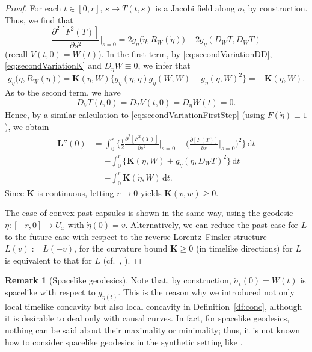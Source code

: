 \documentclass[a4paper,11pt]{article}
\numberwithin{equation}{section}
\theoremstyle{definition}
\newtheorem{remark}[definition]{Remark}
\theoremstyle{plain}
\newcommand{\del}{\partial}
\newcommand{\lra}{\longrightarrow}
\newcommand{\bK}{\mathbf{K}}
\newcommand{\bL}{\mathbf{L}}
\newcommand{\dd}{\mathrm{d}}
\begin{document}
\begin{proof}
For each $t \in [0,r]$, $s \longmapsto T(t,s)$ is a Jacobi field along $\sigma_t$ by construction.
Thus, we find that
\[ \frac{\del^2 [F^2(T)]}{\del s^2}\Big|_{s=0}
= 2g_{\dot{\eta}} \bigl( \dot{\eta},R_W(\dot{\eta}) \bigr) -2g_{\dot{\eta}}(D_W T,D_W T) \]
(recall $V(t,0)=W(t)$).
In the first term, by \eqref{eq:secondVariationDD}, \eqref{eq:secondVariationK} and $D_{\dot{\eta}}W \equiv 0$, we infer that
\[ g_{\dot{\eta}} \bigl( \dot{\eta},R_W(\dot{\eta}) \bigr)
=\bK(\dot{\eta},W) \bigl\{ g_{\dot{\eta}}(\dot{\eta},\dot{\eta}) g_{\dot{\eta}}(W,W) -g_{\dot{\eta}}(\dot{\eta},W)^2 \bigr\}
=-\bK(\dot{\eta},W). \]
As to the second term, we have
\[ D_V T(t,0) =D_T V(t,0) =D_{\dot{\eta}} W(t) =0. \]
Hence, by a similar calculation to \eqref{eq:secondVariationFirstStep} (using $F(\dot{\eta}) \equiv 1$), we obtain
\begin{align*}
\bL''(0) &= \int_0^r \biggl\{ \frac{1}{2} \frac{\del^2 [F^2(T)]}{\del s^2}\Big|_{s=0}
-\biggl( \frac{\del [F(T)]}{\del s} \Big|_{s=0} \biggr)^2 \biggr\} \,\dd t \\
&=-\int_0^r \bigl\{  \bK(\dot{\eta},W)
+g_{\dot{\eta}}(\dot{\eta},D_W T)^2  \bigr\} \,\dd t \\
&=-\int_0^r \bK(\dot{\eta},W) \,\dd t.
\end{align*}
Since $\bK$ is continuous, letting $r \to 0$ yields $\bK(v,w) \geq 0$.

The case of convex past capsules is shown in the same way, using the geodesic $\eta\colon [-r,0] \lra U_x$ with $\dot{\eta}(0)=v$.
Alternatively, we can reduce the past case for $L$ to the future case with respect to the reverse Lorentz--Finsler structure $\overline{L}(v):=L(-v)$, for the curvature bound $\bK \ge 0$ (in timelike directions) for $L$ is equivalent to that for $\overline{L}$
(cf.\ \cite[Remark~8.14]{LMO1}, \cite[\S 2.5]{Obook}).
\end{proof}

\begin{remark}[Spacelike geodesics]
\label{rm:spacelike}
Note that, by construction, $\dot{\sigma}_t(0)=W(t)$ is spacelike with respect to $g_{\dot{\eta}(t)}$.
This is the reason why we introduced not only local timelike concavity but also local concavity in Definition~\ref{df:conc}, although it is desirable to deal only with causal curves.
In fact, for spacelike geodesics, nothing can be said about their maximality or minimality;
thus, it is not known how to consider spacelike geodesics in the synthetic setting like \cite{KS,BKR,EG}.
\end{remark}
\end{document}
